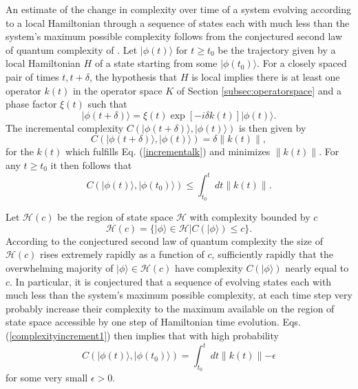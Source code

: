 \documentclass[twocolumn,amsmath,amssymb]{revtex4-1}
\begin{document}
An estimate of the change in complexity over time of a system
evolving according to a local Hamiltonian  through a sequence of
states each with much less than the system's maximum possible complexity
follows from the conjectured second law of quantum complexity of \cite{Susskind}.
Let $|\phi(t) \rangle $ for $t \ge t_0$ be the trajectory given by a  local Hamiltonian $H$
of a state
starting from some $|\phi(t_0) \rangle $.
For a closely spaced pair of times $t, t + \delta$, the hypothesis that $H$ is local implies
there is at least one operator
$k(t)$ in the operator space $K$ of Section \ref{subsec:operatorspace} and a phase factor
$\xi(t)$ such that
\begin{equation}
  \label{incrementalk}
  |\phi( t + \delta) \rangle  = \xi(t) \exp[ -i \delta k(t)] |\phi(t) \rangle .
\end{equation}
The incremental complexity $C( |\phi(t + \delta) \rangle , |\phi(t) \rangle )$ is then
given by
\begin{equation}
  \label{complexityincrement}
  C( |\phi(t + \delta) \rangle , |\phi(t) \rangle ) = \delta \parallel k(t) \parallel,
\end{equation}
for the $k(t)$ which fulfills Eq. (\ref{incrementalk}) and minimizes $ \parallel k(t) \parallel$.
For any $t \ge t_0$ it then follows that
\begin{equation}
  \label{complexityincrement1}
  C( |\phi(t) \rangle , |\phi(t_0) \rangle ) \le \int_{t_0}^t dt \parallel k(t) \parallel.
\end{equation}

Let $\mathcal{H}(c)$ be the region of state space $\mathcal{H}$ with complexity
bounded by $c$
\begin{equation}
  \label{defhofc}
  \mathcal{H}(c) = \{ |\phi \rangle  \in \mathcal{H} | C( |\phi \rangle ) \le c \}.
\end{equation}
According to the conjectured second law of quantum complexity
the size of $\mathcal{H}(c)$ rises extremely rapidly
as a function of $c$, sufficiently rapidly 
that the overwhelming majority of  $|\phi \rangle  \in \mathcal{H}(c)$ have complexity $C( |\phi \rangle )$
nearly equal to $c$.
In particular, it is conjectured that 
a sequence of evolving states each
with much less than the system's maximum possible complexity,
at each time step very probably increase their complexity to
the maximum available on the region of state space accessible by
one step of Hamiltonian time evolution.
Eqs. (\ref{complexityincrement1}) then implies that
with high probability
\begin{equation}
  \label{complexityincrement2}
  C( |\phi(t) \rangle , |\phi(t_0) \rangle ) = \int_{t_0}^t dt \parallel k(t) \parallel - \epsilon
\end{equation}
for some very small $\epsilon > 0$.
\end{document}
